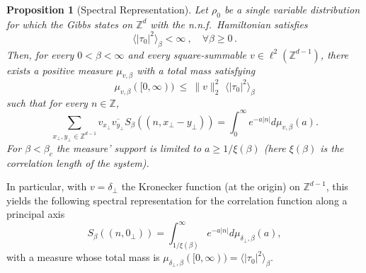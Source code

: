 \documentclass[a4paper,oneside,11pt]{article}
\def\Z{\mathbb{Z}}                          %
\newtheorem{proposition}[theorem]{Proposition}
\newcommand{\be}[1]{\begin{equation}\label{#1}}
\newcommand{\ee}{\end{equation}}
\numberwithin{equation}{section}
\numberwithin{equation}{section}
\numberwithin{equation}{section}
\def\Z{\mathbb{Z}}                          %
\def\be{\begin{equation}}
\def\ee{\end{equation}}
\begin{document}
\begin{proposition}[Spectral Representation]\label{prop:spec_rep}  Let $\rho_0$ be a single variable distribution for which  the Gibbs states on $\Z^d$ with the n.n.f.~Hamiltonian satisfies 
\be 
\langle |\tau_0|^2 \rangle_\beta  < \infty\ , \quad \forall  \beta \geq 0 \,.
\ee 
Then, for every $0 < \beta < \infty$  and  every  square-summable   $v\in \ell^2(\Z^{d-1})$, there exists a positive measure $\mu_{v,\beta}$ with a total mass satisfying 
\be \mu_{v,\beta}([0,\infty)) \ \leq \    \|v\|_2^2 \, \, \langle |\tau_0|^2 \rangle_\beta 
\ee  
such that for every $n\in \Z$,
 \begin{equation} \label{eq:spec_rep_app}
\sum_{x_\perp,y_\perp\in \Z^{d-1}}v_{x_\perp}\overline{v_{y_\perp}}S_\beta((n,x_\perp-y_\perp))=   
 \int_{0}^\infty e^{-a|n|} d\mu_{v,\beta} ( a).
 \end{equation}
For $\beta < \beta_c$ the measure' support is limited to $a\geq 1/\xi(\beta)$ (here $\xi(\beta)$ is the correlation length of the system). \end{proposition}
 

In particular, with  $v=\delta_\perp$ the Kronecker function (at the origin) on $\mathbb Z^{d-1}$,  this yields the following spectral representation for the correlation function along a principal axis 
\be \label{eq:S_spec}
 S_{\beta}((n,0_\perp))  =   
 \int_{1/\xi(\beta)}^\infty e^{-a|n|} d\mu_{\delta_\perp,\beta} (a),
 \ee
with a measure whose total mass is   $\mu_{\delta_\perp,\beta}([0,\infty))= \langle |\tau_0|^2 \rangle_\beta$. 
\end{document}
